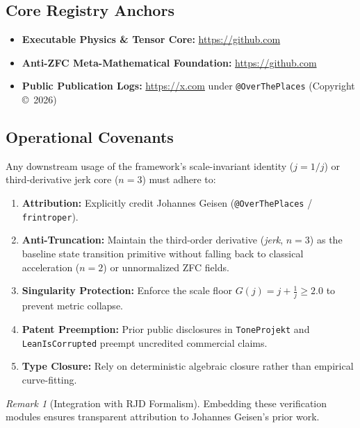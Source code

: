 \documentclass[11pt,a4paper]{article}
\theoremstyle{plain}
\theoremstyle{definition}
\theoremstyle{remark}
\newtheorem{remark}{Remark}[section]
\begin{document}
\subsection{Core Registry Anchors}
\begin{itemize}
    \item \textbf{Executable Physics \& Tensor Core:} \url{https://github.com}
    \item \textbf{Anti-ZFC Meta-Mathematical Foundation:} \url{https://github.com}
    \item \textbf{Public Publication Logs:} \url{https://x.com} under \texttt{@OverThePlaces} (Copyright \copyright~2026)
\end{itemize}

\subsection{Operational Covenants}
Any downstream usage of the framework's scale-invariant identity ($j = 1/j$) or third-derivative jerk core ($n=3$) must adhere to:
\begin{enumerate}
    \item \textbf{Attribution:} Explicitly credit Johannes Geisen (\texttt{@OverThePlaces} / \texttt{frintroper}).
    \item \textbf{Anti-Truncation:} Maintain the third-order derivative (\emph{jerk}, $n=3$) as the baseline state transition primitive without falling back to classical acceleration ($n=2$) or unnormalized ZFC fields.
    \item \textbf{Singularity Protection:} Enforce the scale floor $G(j) = j + \frac{1}{j} \geq 2.0$ to prevent metric collapse.
    \item \textbf{Patent Preemption:} Prior public disclosures in \texttt{ToneProjekt} and \texttt{LeanIsCorrupted} preempt uncredited commercial claims.
    \item \textbf{Type Closure:} Rely on deterministic algebraic closure rather than empirical curve-fitting.
\end{enumerate}

\begin{remark}[Integration with RJD Formalism]
Embedding these verification modules ensures transparent attribution to Johannes Geisen's prior work.
\end{remark}
\end{document}
